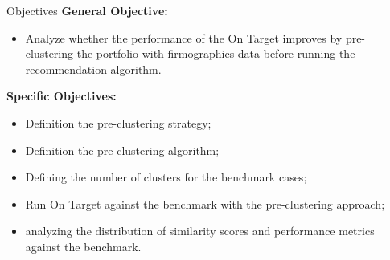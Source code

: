 \begin{frame}{Objectives} \pause
\textbf{General Objective:\\} \pause
\begin{itemize}
    \item Analyze whether the performance of the On Target improves by pre-clustering the portfolio with firmographics data before running the recommendation algorithm.  \pause
\end{itemize}
\vspace{0.5cm}
\textbf{Specific Objectives:\\} \pause
\begin{itemize}
    \item Definition the pre-clustering strategy; \pause
    \item Definition the pre-clustering algorithm; \pause
    \item Defining the number of clusters for the benchmark cases; \pause
    \item Run On Target against the benchmark with the pre-clustering approach; \pause
    \item analyzing the distribution of similarity scores and performance metrics against the benchmark.
\end{itemize}
\end{frame}